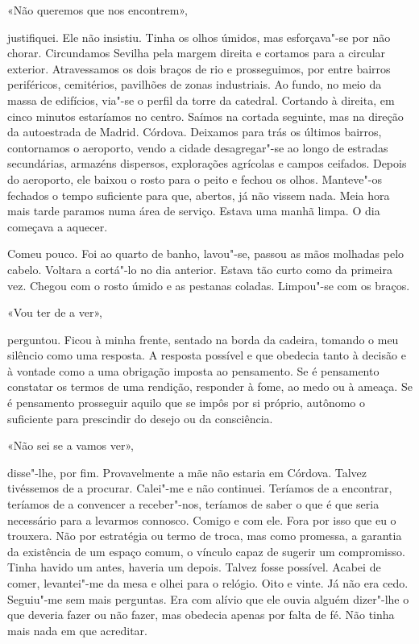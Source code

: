 «Não queremos que nos encontrem»,

justifiquei. Ele não insistiu. Tinha os olhos úmidos, mas
esforçava"-se por não chorar. Circundamos Sevilha pela margem direita e
cortamos para a circular exterior. Atravessamos os dois braços de rio e
prosseguimos, por entre bairros periféricos, cemitérios, pavilhões de
zonas industriais. Ao fundo, no meio da massa de edifícios, via"-se o
perfil da torre da catedral. Cortando à direita, em cinco minutos
estaríamos no centro. Saímos na cortada seguinte, mas na direção da
autoestrada de Madrid. Córdova. Deixamos para trás os últimos bairros,
contornamos o aeroporto, vendo a cidade desagregar"-se ao longo de
estradas secundárias, armazéns dispersos, explorações agrícolas e campos
ceifados. Depois do aeroporto, ele baixou o rosto para o peito e fechou
os olhos. Manteve"-os fechados o tempo suficiente para que, abertos, já
não vissem nada. Meia hora mais tarde paramos numa área de serviço.
Estava uma manhã limpa. O dia começava a aquecer.

Comeu pouco. Foi ao quarto de banho, lavou"-se, passou as mãos molhadas
pelo cabelo. Voltara a cortá"-lo no dia anterior. Estava tão curto como
da primeira vez. Chegou com o rosto úmido e as pestanas coladas.
Limpou"-se com os braços.

«Vou ter de a ver»,

perguntou. Ficou à minha frente, sentado na borda da cadeira, tomando o
meu silêncio como uma resposta. A resposta possível e que obedecia tanto
à decisão e à vontade como a uma obrigação imposta ao pensamento. Se é
pensamento constatar os termos de uma rendição, responder à fome, ao
medo ou à ameaça. Se é pensamento prosseguir aquilo que se impôs por si
próprio, autônomo o suficiente para prescindir do desejo ou da
consciência.

«Não sei se a vamos ver»,

disse"-lhe, por fim. Provavelmente a mãe não estaria em Córdova. Talvez
tivéssemos de a procurar. Calei"-me e não continuei. Teríamos de a
encontrar, teríamos de a convencer a receber"-nos, teríamos de saber o
que é que seria necessário para a levarmos connosco. Comigo e com ele.
Fora por isso que eu o trouxera. Não por estratégia ou termo de troca,
mas como promessa, a garantia da existência de um espaço comum, o
vínculo capaz de sugerir um compromisso. Tinha havido um antes, haveria
um depois. Talvez fosse possível. Acabei de comer, levantei"-me da mesa
e olhei para o relógio. Oito e vinte. Já não era cedo. Seguiu"-me sem
mais perguntas. Era com alívio que ele ouvia alguém dizer"-lhe o que
deveria fazer ou não fazer, mas obedecia apenas por falta de fé. Não
tinha mais nada em que acreditar.

